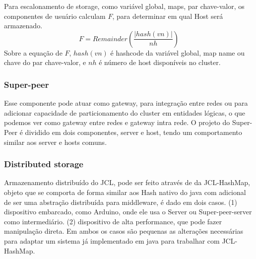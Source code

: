 \documentclass[12pt]{article}
\begin{document}
Para escalonamento de storage, como variável global, maps, par chave-valor, os componentes de usuário calculam \(F\), para determinar em qual Host será armazenado.
\begin{displaymath}
F = Remainder\left ( \frac{\left | hash(vn) \right |}{nh} \right )
\end{displaymath}
Sobre a equação de \(F\), \(hash(vn)\) é hashcode da variável global, map name ou chave do par chave-valor, e \(nh\) é número de host disponíveis no cluster.


\subsubsection{Super-peer}
Esse componente pode atuar como gateway, para integração entre redes ou para adicionar capacidade de particionamento do cluster em entidades lógicas, o que podemos ver como gateway entre redes e gateway intra rede. O projeto do Super-Peer é dividido em dois componentes, server e host, tendo um comportamento similar aos server e hosts comuns.



\subsubsection{Distributed storage}
Armazenamento distribuído do JCL, pode ser feito através de da JCL-HashMap, objeto que se comporta de forma similar aos Hash nativo do java com adicional de ser uma abstração distribuída para middleware, é dado em dois casos. (1) dispositivo embarcado, como Arduino, onde ele usa o Server ou Super-peer-server como intermediário. (2) dispositivo de alta performance, que pode fazer manipulação direta. Em ambos os casos são pequenas as alterações necessárias para adaptar um sistema já implementado em java para trabalhar com JCL-HashMap.
\end{document}

